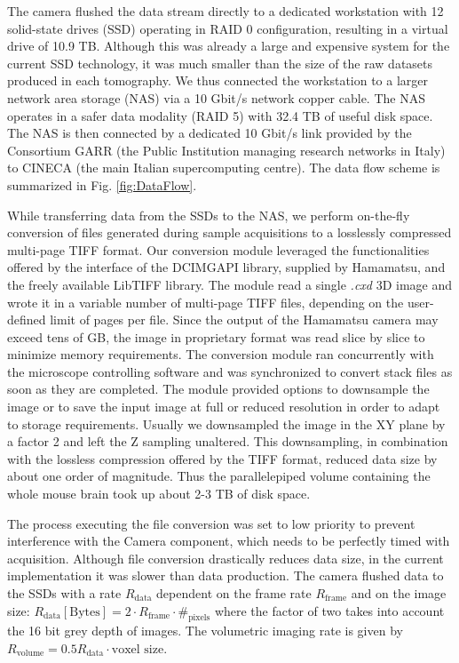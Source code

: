 \documentclass[12pt]{spieman}  %
\begin{document}
\begin{spacing}{2}
The camera flushed the data stream directly to a dedicated workstation with 12 solid-state drives (SSD) operating in RAID 0 configuration, resulting in a virtual drive of 10.9 TB. Although this was already a large and expensive system for the current SSD technology, it was much smaller than the size of the raw datasets produced in each tomography. We thus connected the workstation to a larger network area storage (NAS) via a 10 Gbit/s network copper cable. The NAS operates in a safer data modality (RAID 5) with 32.4 TB of useful disk space. The NAS is then connected by a dedicated 10 Gbit/s link provided by the Consortium GARR (the Public Institution managing research networks in Italy) to CINECA (the main Italian supercomputing centre). The data flow scheme is summarized in Fig. \ref{fig:DataFlow}.

While transferring data from the SSDs to the NAS, we perform on-the-fly conversion of files generated during sample acquisitions to a losslessly compressed multi-page TIFF format. Our conversion module leveraged the functionalities offered by the interface of the DCIMGAPI library, supplied by Hamamatsu, and the freely available LibTIFF library. The module read a single \textit{.cxd} 3D image and wrote it in a variable number of multi-page TIFF files, depending on the user-defined limit of pages per file. Since the output of the Hamamatsu camera may exceed tens of GB, the image in proprietary format was read slice by slice to minimize memory requirements. The conversion module ran concurrently with the microscope controlling software and was synchronized to convert stack files as soon as they are completed. The module provided options to downsample the image or to save the input image at full or reduced resolution in order to adapt to storage requirements. Usually we downsampled the image in the XY plane by a factor 2 and left the Z sampling unaltered. This downsampling, in combination with the lossless compression offered by the TIFF format, reduced data size by about one order of magnitude. Thus the parallelepiped volume containing the whole mouse brain took up about 2-3 TB of disk space. 

The process executing the file conversion was set to low priority to prevent interference with the Camera component, which needs to be perfectly timed with acquisition. Although file conversion drastically reduces data size, in the current implementation it was slower than data production. The camera flushed data to the SSDs with a rate $R_{\text{data}}$ dependent on the frame rate $R_{\text{frame}}$ and on the image size: $R_{\text{data}} [\text{Bytes}] = 2\cdot R_{\text{frame}} \cdot \#_{\text{pixels}}$
where the factor of two takes into account the 16 bit grey depth of images. The volumetric imaging rate is given by $R_{\text{volume}} = 0.5 R_{\text{data}} \cdot \text{voxel size}$.


\end{spacing}
\end{document}
